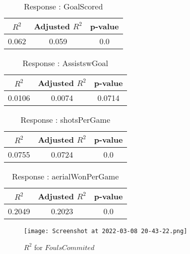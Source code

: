 \documentclass[12pt]{article}
\begin{document}
\begin{minipage}{0.5\textwidth}
	\begin{table}[H]
	\centering
	\caption{Response : GoalScored}\label{table:1a}
	{\begin{tabular}{|c|c|c|}
			\hline
			$ R^2 $ & Adjusted $ R^2 $ & p-value \\
			\hline
			0.062 & 0.059 & 0.0 \\
			\hline
		\end{tabular}
	}
\end{table}
\begin{table}[H]
	\centering
	\caption{Response : AssistswGoal}\label{table:1a}
	{\begin{tabular}{|c|c|c|}
			\hline
			$ R^2 $ & Adjusted $ R^2 $ & p-value \\
			\hline
			0.0106 & 0.0074 & 0.0714 \\
			\hline
		\end{tabular}
	}
\end{table}
\end{minipage}
\hfill
\begin{minipage}{0.5\textwidth}
	\begin{table}[H]
	\centering
	\caption{Response : shotsPerGame }\label{table:1a}
	{\begin{tabular}{|c|c|c|}
			\hline
			$ R^2 $ & Adjusted $ R^2 $ & p-value \\
			\hline
			0.0755 & 0.0724 & 0.0 \\
			\hline
		\end{tabular}
	}
\end{table}
\begin{table}[H]
	\centering
	\caption{Response : aerialWonPerGame}\label{table:1a}
	{\begin{tabular}{|c|c|c|}
			\hline
			$ R^2 $ & Adjusted $ R^2 $ & p-value \\
			\hline
			0.2049 & 0.2023 & 0.0 \\
			\hline
		\end{tabular}
	}
\end{table}
\end{minipage}

\begin{figure}[H]
	\centering
	\texttt{[image: Screenshot at 2022-03-08 20-43-22.png]}
	\caption{$ R^2 $ for $ FoulsCommited $}
	\label{fig:1}
\end{figure}
\end{document}
